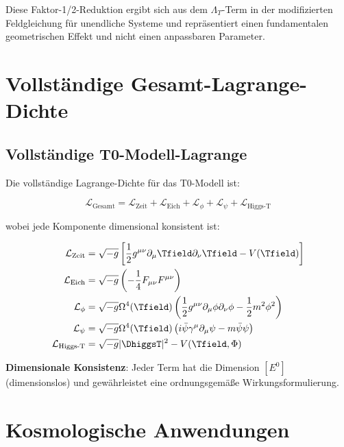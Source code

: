 	Diese Faktor-1/2-Reduktion ergibt sich aus dem $\Lambda_T$-Term in der modifizierten Feldgleichung für unendliche Systeme und repräsentiert einen fundamentalen geometrischen Effekt und nicht einen anpassbaren Parameter.
	
	\section{Vollständige Gesamt-Lagrange-Dichte}
	\label{sec:gesamt_lagrange}
	
	\subsection{Vollständige T0-Modell-Lagrange}
	\label{subsec:vollstaendige_lagrange}
	
	Die vollständige Lagrange-Dichte für das T0-Modell ist:
	
	\begin{equation}
		\mathcal{L}_{\text{Gesamt}} = \mathcal{L}_{\text{Zeit}} + \mathcal{L}_{\text{Eich}} + \mathcal{L}_{\phi} + \mathcal{L}_{\psi} + \mathcal{L}_{\text{Higgs-T}}
		\label{eq:gesamt_lagrange}
	\end{equation}
	
	wobei jede Komponente dimensional konsistent ist:
	
	\begin{align}
		\mathcal{L}_{\text{Zeit}} &= \sqrt{-g} \left[\frac{1}{2} g^{\mu\nu} \partial_\mu \Tfield \partial_\nu \Tfield - V(\Tfield)\right] \\
		\mathcal{L}_{\text{Eich}} &= \sqrt{-g} \left(-\frac{1}{4} F_{\mu\nu} F^{\mu\nu}\right) \\
		\mathcal{L}_{\phi} &= \sqrt{-g} \Omega^4(\Tfield) \left(\frac{1}{2} g^{\mu\nu} \partial_\mu \phi \partial_\nu \phi - \frac{1}{2} m^2 \phi^2\right) \\
		\mathcal{L}_{\psi} &= \sqrt{-g} \Omega^4(\Tfield) \left(i\bar{\psi}\gamma^\mu\partial_\mu\psi - m\bar{\psi}\psi\right) \\
		\mathcal{L}_{\text{Higgs-T}} &= \sqrt{-g} |\DhiggsT|^2 - V(\Tfield, \Phi)
	\end{align}
	
	\textbf{Dimensionale Konsistenz}: Jeder Term hat die Dimension $[E^0]$ (dimensionslos) und gewährleistet eine ordnungsgemäße Wirkungsformulierung.
	
	\section{Kosmologische Anwendungen}
	\label{sec:kosmologische_anwendungen}
	

